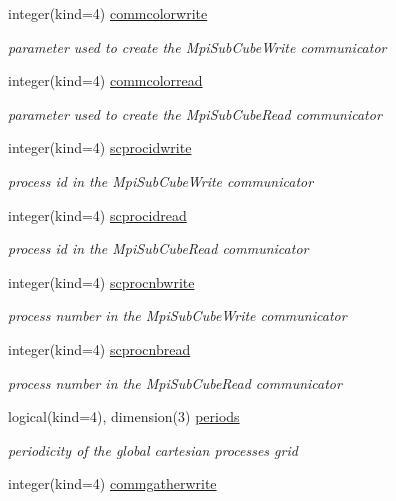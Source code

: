 \begin{DoxyCompactItemize}
integer(kind=4) \hyperlink{namespacemodmpicom_a10897435b88ede934389b5099b4a2f7f}{commcolorwrite}
\begin{DoxyCompactList}\small\item\em parameter used to create the Mpi\+Sub\+Cube\+Write communicator \end{DoxyCompactList}\item 
integer(kind=4) \hyperlink{namespacemodmpicom_a0ba0397b7d92b456e11a65bce1f86e7c}{commcolorread}
\begin{DoxyCompactList}\small\item\em parameter used to create the Mpi\+Sub\+Cube\+Read communicator \end{DoxyCompactList}\item 
integer(kind=4) \hyperlink{namespacemodmpicom_a0bade7a409f7af1432be0253a6262442}{scprocidwrite}
\begin{DoxyCompactList}\small\item\em process id in the Mpi\+Sub\+Cube\+Write communicator \end{DoxyCompactList}\item 
integer(kind=4) \hyperlink{namespacemodmpicom_a23d8fed28f6705c564d6a10038de36c7}{scprocidread}
\begin{DoxyCompactList}\small\item\em process id in the Mpi\+Sub\+Cube\+Read communicator \end{DoxyCompactList}\item 
integer(kind=4) \hyperlink{namespacemodmpicom_a8281c8567826b44d76d7a801203c99a8}{scprocnbwrite}
\begin{DoxyCompactList}\small\item\em process number in the Mpi\+Sub\+Cube\+Write communicator \end{DoxyCompactList}\item 
integer(kind=4) \hyperlink{namespacemodmpicom_a8fde31beaf4b43228d7f93325630cefa}{scprocnbread}
\begin{DoxyCompactList}\small\item\em process number in the Mpi\+Sub\+Cube\+Read communicator \end{DoxyCompactList}\item 
logical(kind=4), dimension(3) \hyperlink{namespacemodmpicom_a0347e6d8a15028132a57953e6ff823a2}{periods}
\begin{DoxyCompactList}\small\item\em periodicity of the global cartesian processes grid \end{DoxyCompactList}\item 
integer(kind=4) \hyperlink{namespacemodmpicom_a81805e955c1ef5ffb5846c0dad06976f}{commgatherwrite}
\end{DoxyCompactItemize}


